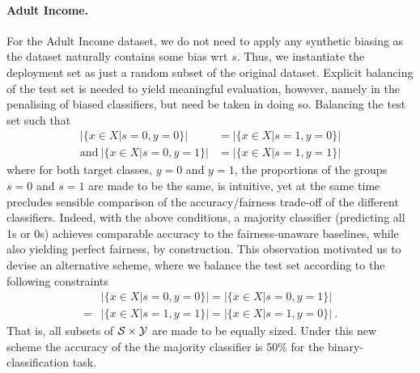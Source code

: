 \paragraph{Adult Income.}\label{ssec:dataset-construction-adult}
For the Adult Income dataset, we do not need to apply any synthetic biasing as the dataset naturally contains some bias wrt $s$. Thus, we instantiate the deployment set as just a random subset of the original dataset. Explicit balancing of the test set is needed to yield meaningful evaluation, however, namely in the penalising of biased classifiers, but need be taken in doing so. Balancing the test set such that
\begin{align}
    |\{x \in X |s=0, y=0\}| &= |\{x \in X |s=1, y=0\}|    \nonumber\\
    \text{and}~|\{x \in X |s=0, y=1\}| &= |\{x \in X |s=1, y=1\}|
\end{align}
where for both target classes, $y=0$ and $y=1$, the proportions of the groups $s=0$ and $s=1$ are made to be the same, is intuitive, yet at the same time precludes sensible comparison of the accuracy/fairness trade-off of the different classifiers.
Indeed, with the above conditions, a majority classifier (predicting all 1s or 0s) achieves comparable accuracy to the fairness-unaware baselines, while also yielding perfect fairness, by construction.
This observation motivated us to devise an alternative scheme, where we balance the test set according to the following constraints
\begin{align}
    & |\{x \in X |s=0, y=0\}| 
    = |\{x \in X |s=0, y=1\}|  \nonumber \\
    = &|\{x \in X |s=1, y=1\}|
    = |\{x \in X |s=1, y=0\}|~.
 \end{align}
That is, all subsets of ${\mathcal{S}} \times {\mathcal{Y}}$ are made to be equally sized. Under this new scheme the accuracy of the the majority classifier is 50\% for the binary-classification task.


